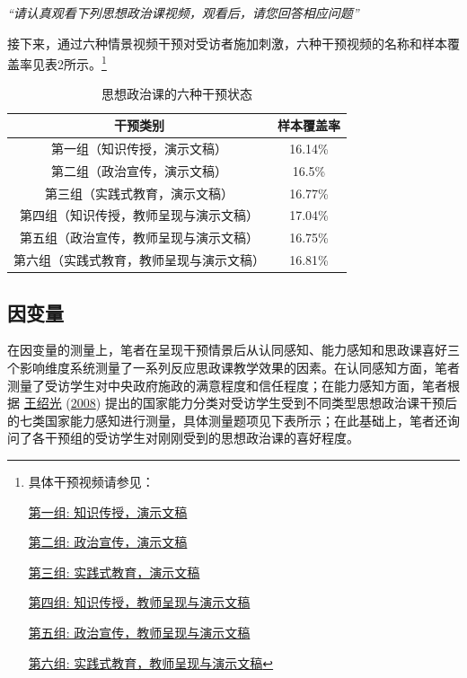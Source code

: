 \documentclass[
  12pt,
]{ctexart}
\begin{document}
\emph{``请认真观看下列思想政治课视频，观看后，请您回答相应问题''}

接下来，通过六种情景视频干预对受访者施加刺激，六种干预视频的名称和样本覆盖率见表2所示。\footnote{具体干预视频请参见：

  \href{http://drhuteam.myqnapcloud.cn:3000/share.cgi?ssid=da48465ff52b44e0999bb593a3f5d920}{第一组: 知识传授，演示文稿}

  \href{http://drhuteam.myqnapcloud.cn:3000/share.cgi?ssid=e4bac8a4f5b34a5c9197ad795bbac936}{第二组: 政治宣传，演示文稿}

  \href{http://drhuteam.myqnapcloud.cn:3000/share.cgi?ssid=f6a5ca2a19b347938bbbcb3728bac669}{第三组: 实践式教育，演示文稿}

  \href{http://drhuteam.myqnapcloud.cn:3000/share.cgi?ssid=88c10f357864478dafb3656f522f261c}{第四组: 知识传授，教师呈现与演示文稿}

  \href{http://drhuteam.myqnapcloud.cn:3000/share.cgi?ssid=439e7fe08ba74563bff9b6d10ed0b201}{第五组: 政治宣传，教师呈现与演示文稿}

  \href{http://drhuteam.myqnapcloud.cn:3000/share.cgi?ssid=2bf45e93f960406a805f935409119f4f}{第六组: 实践式教育，教师呈现与演示文稿}}

\begin{table}[!h]

\caption{\label{tab:unnamed-chunk-4}思想政治课的六种干预状态}
\centering
\begin{tabular}[t]{cc}
\toprule
干预类别 & 样本覆盖率\\
\midrule
第一组（知识传授，演示文稿） & 16.14\%\\
第二组（政治宣传，演示文稿） & 16.5\%\\
第三组（实践式教育，演示文稿） & 16.77\%\\
第四组（知识传授，教师呈现与演示文稿） & 17.04\%\\
第五组（政治宣传，教师呈现与演示文稿） & 16.75\%\\
\addlinespace
第六组（实践式教育，教师呈现与演示文稿） & 16.81\%\\
\bottomrule
\end{tabular}
\end{table}

\hypertarget{ux56e0ux53d8ux91cf}{%
\subsection{因变量}\label{ux56e0ux53d8ux91cf}}

在因变量的测量上，笔者在呈现干预情景后从认同感知、能力感知和思政课喜好三个影响维度系统测量了一系列反应思政课教学效果的因素。在认同感知方面，笔者测量了受访学生对中央政府施政的满意程度和信任程度；在能力感知方面，笔者根据 \protect\hyperlink{ref-WangShaoGuang2008}{王绍光} (\protect\hyperlink{ref-WangShaoGuang2008}{2008}) 提出的国家能力分类对受访学生受到不同类型思想政治课干预后的七类国家能力感知进行测量，具体测量题项见下表所示；在此基础上，笔者还询问了各干预组的受访学生对刚刚受到的思想政治课的喜好程度。
\end{document}
